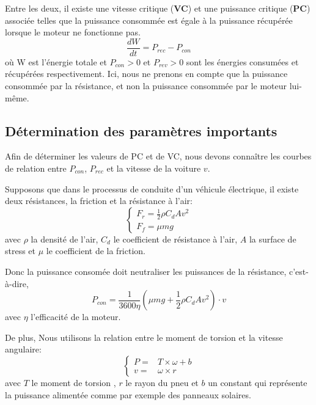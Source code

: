 \documentclass[lettersize,journal]{IEEEtran}
\begin{document}
Entre les deux, il existe une vitesse critique (\textbf{VC}) et une puissance critique (\textbf{PC}) associée telles que la puissance consommée est égale à la puissance récupérée lorsque le moteur ne fonctionne pas.\\
\begin{equation}
    \frac{dW}{dt} = P_{rec} - P_{con}
\end{equation}
où W est l'énergie totale et $P_{con} > 0$ et $P_{rev} > 0$ sont les énergies consumées et récupérées respectivement.
Ici, nous ne prenons en compte que la puissance consommée par la résistance, et non la puissance consommée par le moteur lui-même.

\subsection{Détermination des paramètres importants}
Afin de déterminer les valeurs de PC et de VC, nous devons connaître les courbes de relation entre $P_{con}$, $P_{rec}$ et la vitesse de la voiture $v$.\par
Supposons que dans le processus de conduite d'un véhicule électrique, il existe deux résistances, la friction et la résistance à l'air:
\begin{equation}
    \begin{cases}
        F_r = \frac{1}{2} \rho C_{d} A v^{2} \\
        F_f = \mu mg
    \end{cases}
\end{equation}
avec $\rho$ la densité de l'air, $C_d$ le coefficient de résistance à l'air, $A$ la surface de stress et $\mu$ le coefficient de la friction.\par
Donc la puissance consomée doit neutraliser les puissances de la résistance, c'est-à-dire,
\begin{equation}
    P_{con} = \frac{1}{3600 \eta}(\mu mg + \frac{1}{2} \rho C_{d} A v^{2}) \cdot v
\end{equation}
avec $\eta$ l'efficacité de la moteur.\par

De plus, Nous utilisons la relation entre le moment de torsion et la vitesse angulaire:
\begin{equation}
    \begin{cases}
        P= &T \times \omega + b \\
        v= &\omega \times r
    \end{cases}
\end{equation}
avec $T$ le moment de torsion , $r$ le rayon du pneu et $b$ un constant qui représente la puissance alimentée comme par exemple des panneaux solaires. \par
\end{document}
